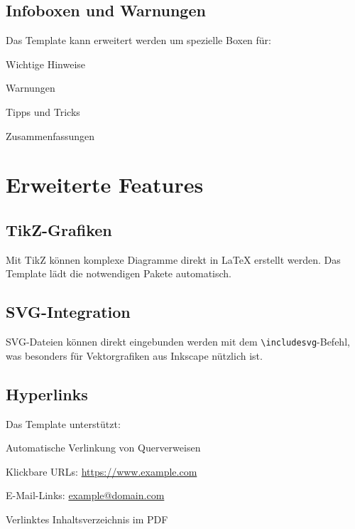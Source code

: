 \subsection*{Infoboxen und Warnungen}
\label{subsec:infoboxen}

Das Template kann erweitert werden um spezielle Boxen für:
\begin{listenabsatz}
	\item Wichtige Hinweise
	\item Warnungen
	\item Tipps und Tricks
	\item Zusammenfassungen
\end{listenabsatz}

\section{Erweiterte Features}
\label{sec:erweiterte_features}

\subsection*{TikZ-Grafiken}
\label{subsec:tikz}

Mit TikZ können komplexe Diagramme direkt in \LaTeX{} erstellt werden. Das Template lädt die notwendigen Pakete automatisch.

\subsection*{SVG-Integration}
\label{subsec:svg}

SVG-Dateien können direkt eingebunden werden mit dem \texttt{\textbackslash includesvg}-Befehl, was besonders für Vektorgrafiken aus Inkscape nützlich ist.

\subsection*{Hyperlinks}
\label{subsec:hyperlinks}

Das Template unterstützt:
\begin{listenabsatz}
	\item Automatische Verlinkung von Querverweisen
	\item Klickbare URLs: \url{https://www.example.com}
	\item E-Mail-Links: \href{mailto:example@domain.com}{example@domain.com}
	\item Verlinktes Inhaltsverzeichnis im PDF
\end{listenabsatz}

